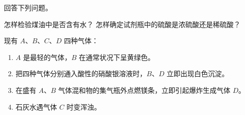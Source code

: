 \begin{Exercise}
\begin{question}
    \item 回答下列问题。
    \begin{tasks}[label=(\arabic*)]
      \task 怎样检验煤油中是否含有水？
      \task 怎样确定试剂瓶中的硫酸是浓硫酸还是稀硫酸？
    \end{tasks}
    \item 现有 $A$、$B$、$C$、$D$ 四种气体：
    \begin{enumerate}[itemindent=2.2em]
      \item $A$ 是最轻的气体，$B$ 在通常状况下呈黄绿色。
      \item 把四种气体分别通入酸性的硝酸银溶液时，$B$、$D$ 立即出现白色沉淀。
      \item 在盛有 $A$、$B$ 气体混和物的集气瓶外点燃镁条，立即引起爆炸生成气体 $D$。
      \item 石灰水遇气体 $C$ 时变浑浊。
    \end{enumerate}


\end{question}
\end{Exercise}
